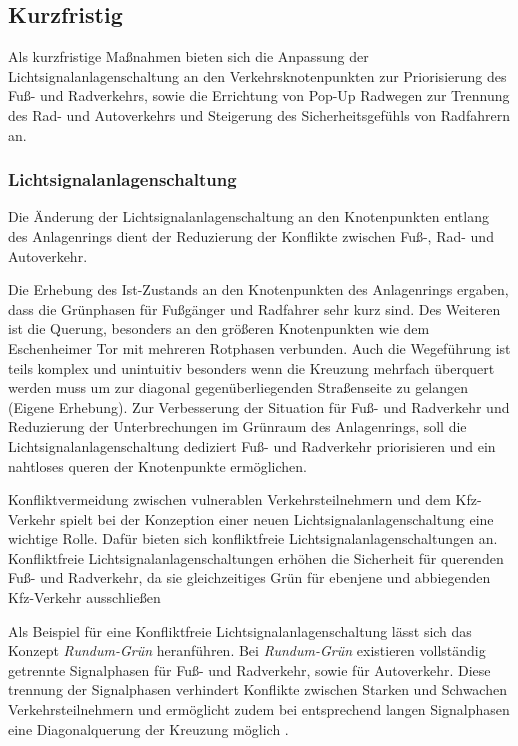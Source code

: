 \documentclass[a4paper,12pt]{article}
\begin{document}
\subsection{Kurzfristig}

Als kurzfristige Maßnahmen bieten sich die Anpassung der Lichtsignalanlagenschaltung an den Verkehrsknotenpunkten zur Priorisierung des Fuß- und Radverkehrs, sowie die Errichtung von Pop-Up Radwegen zur Trennung des Rad- und Autoverkehrs und Steigerung des Sicherheitsgefühls von Radfahrern an.

\subsubsection{Lichtsignalanlagenschaltung}

Die Änderung der Lichtsignalanlagenschaltung an den Knotenpunkten entlang des Anlagenrings dient der Reduzierung der Konflikte zwischen Fuß-, Rad- und Autoverkehr.

Die Erhebung des Ist-Zustands an den Knotenpunkten des Anlagenrings ergaben, dass die Grünphasen für Fußgänger und Radfahrer sehr kurz sind. Des Weiteren ist die Querung, besonders an den größeren Knotenpunkten wie dem Eschenheimer Tor mit mehreren Rotphasen verbunden. Auch die Wegeführung ist teils komplex und unintuitiv besonders wenn die Kreuzung mehrfach überquert werden muss um zur diagonal gegenüberliegenden Straßenseite zu gelangen (Eigene Erhebung).
Zur Verbesserung der Situation für Fuß- und Radverkehr und Reduzierung der Unterbrechungen im Grünraum des Anlagenrings, soll die Lichtsignalanlagenschaltung dediziert Fuß- und Radverkehr priorisieren und ein nahtloses queren der Knotenpunkte ermöglichen.

Konfliktvermeidung zwischen vulnerablen Verkehrsteilnehmern und dem Kfz-Verkehr spielt bei der Konzeption einer neuen Lichtsignalanlagenschaltung eine wichtige Rolle. Dafür bieten sich konfliktfreie Lichtsignalanlagenschaltungen an. Konfliktfreie Lichtsignalanlagenschaltungen erhöhen die Sicherheit für querenden Fuß- und Radverkehr, da sie gleichzeitiges Grün für ebenjene und abbiegenden Kfz-Verkehr ausschließen \autocite[11]{zotero-item-63}

Als Beispiel für eine Konfliktfreie Lichtsignalanlagenschaltung lässt sich das Konzept \textit{Rundum-Grün} heranführen. Bei \textit{Rundum-Grün} existieren vollständig getrennte Signalphasen für Fuß- und Radverkehr, sowie für Autoverkehr. Diese trennung der Signalphasen verhindert Konflikte zwischen Starken und Schwachen Verkehrsteilnehmern und ermöglicht zudem bei entsprechend langen Signalphasen eine Diagonalquerung der Kreuzung möglich \autocite[12]{zotero-item-63}.
\end{document}
